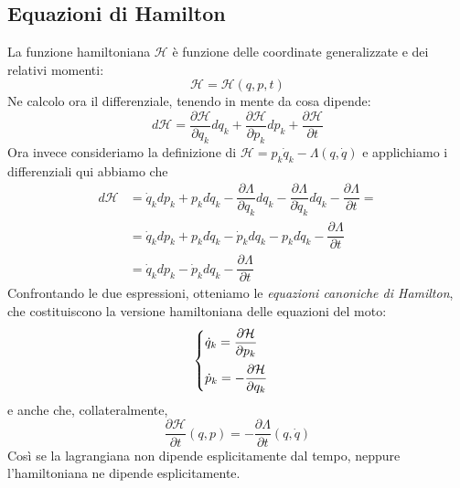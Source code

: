 \documentclass[a4paper,openany]{article}
\begin{document}
	\subsection{Equazioni di Hamilton}
	La funzione hamiltoniana $\mathcal{H}$ è funzione delle coordinate generalizzate e dei relativi momenti:
	$$
	\mathcal{H} = \mathcal{H}(q,p,t)
	$$
	Ne calcolo ora il differenziale, tenendo in mente da cosa dipende:
	\begin{equation}\label{key}
		d\mathcal{H} = \dfrac{\partial \mathcal{H}}{\partial q_k}dq_k +\dfrac{\partial \mathcal{H}}{\partial p_k}dp_k + \dfrac{\partial \mathcal{H}}{\partial t}
	\end{equation}
	Ora invece consideriamo la definizione di $\mathcal{H} = p_k\dot{q}_k  -\Lambda(q,\dot{q})$ e applichiamo i differenziali qui abbiamo che
	\begin{equation}
		\begin{aligned}
			d\mathcal{H} &= \dot{q}_k dp_k + p_k d\dot{q}_k -\dfrac{\partial \Lambda}{\partial q_k}dq_k -\dfrac{\partial \Lambda}{\partial \dot{q}_k}d\dot{q}_k - \dfrac{\partial \Lambda}{\partial t} =\\
			&= \dot{q}_k dp_k + p_k d\dot{q}_k - \dot{p}_k dq_k - p_k d\dot{q}_k - \dfrac{\partial \Lambda}{\partial t} \\
			&= \dot{q}_k dp_k -  \dot{p}_k dq_k - \dfrac{\partial \Lambda}{\partial t} 
		\end{aligned}
	\end{equation}
	Confrontando le due espressioni, otteniamo le \textit{equazioni canoniche di Hamilton}, che costituiscono la versione hamiltoniana delle equazioni del moto:
	\begin{equation}\label{key}
		\begin{cases}
			\dot{q}_k = \dfrac{\partial \mathcal{H}}{\partial p_k}\vspace{2mm}   \\
			
			\dot{p}_k = -\dfrac{\partial \mathcal{H}}{\partial q_k}
		\end{cases}
	\end{equation}
	e anche che, collateralmente,
	\begin{equation}\label{key}
		\dfrac{\partial \mathcal{H}}{\partial t}(q,p) = - \dfrac{\partial \Lambda}{\partial t}(q,\dot{q})
	\end{equation}
	Così se la lagrangiana non dipende esplicitamente dal tempo, neppure l'hamiltoniana ne dipende esplicitamente. 
\end{document}
